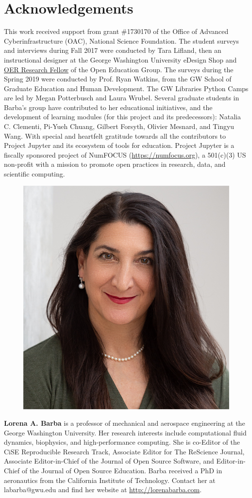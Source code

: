 \documentclass[10pt,journal,compsoc]{IEEEtran}
\begin{document}
\section*{Acknowledgements}

This work received support from grant \#1730170  of the Office of Advanced Cyberinfrastructure (OAC), National Science Foundation. 
The student surveys and interviews during Fall 2017 were conducted by Tara Lifland, then an instructional designer at the  George Washington University eDesign Shop and \href{http://openedgroup.org/fellowship}{OER Research Fellow} of the Open Education Group. 
The surveys during the Spring 2019 were conducted by Prof. Ryan Watkins, from the GW School of Graduate Education and Human Development. 
The GW Libraries Python Camps are led by Megan Potterbusch and Laura Wrubel.
Several graduate students in Barba's group have contributed to her educational initiatives, and the development of learning modules (for this project and its predecessors): Natalia C. Clementi, Pi-Yueh Chuang, Gilbert Forsyth, Olivier Mesnard, and Tingyu Wang.
With special and heartfelt gratitude towards all the contributors to Project Jupyter and its ecosystem of tools for education. 
Project Jupyter is a fiscally sponsored project of NumFOCUS (\href{https://numfocus.org}{https://numfocus.org}), a 501(c)(3) US non-profit with a mission to promote open practices in research, data, and scientific computing.

\bigskip

\begin{figure}
\includegraphics[width=3 cm]{lorena_barba_130_2019.png}
\end{figure}
\noindent \textbf{Lorena A. Barba} is a professor of mechanical and aerospace engineering at the George Washington University. Her research interests include computational fluid dynamics, biophysics, and high-performance computing. She is co-Editor of the CiSE Reproducible Research Track, Associate Editor for The ReScience Journal, Associate Editor-in-Chief of the Journal of Open Source Software, and Editor-in-Chief of the Journal of Open Source Education. Barba received a PhD in aeronautics from the California Institute of Technology. Contact her at labarba@gwu.edu and find her website at \href{http://lorenabarba.com}{http://lorenabarba.com}.




%
\end{document}
